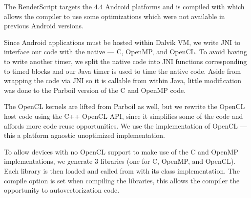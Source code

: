 The RenderScript targets the $4.4$ Android platforms and 
	is compiled with  which
	allows the compiler to use some optimizations which were not available in
	previous Android versions.

Since Android applications must be hosted within Dalvik VM, we write JNI to 
	interface our code with the native 
	--- C, OpenMP, and OpenCL. To avoid having to write another timer, 
	we split the native code into JNI functions corresponding to timed blocks and our
	Java timer is used to time the native code.
	Aside from
wrapping the code via JNI so it is callable from within Java, little
modification was done to the Parboil version of the C and OpenMP code.


The OpenCL kernels are lifted from Parboil as well, but we rewrite the 
	OpenCL host code using the C++ OpenCL API, since it simplifies some of the
	code and affords more code reuse opportunities.
We use the  implementation of OpenCL --- this a
platform agnostic unoptimized implementation.

To allow devices with no OpenCL support to make use of the C and OpenMP
implementations, we generate 3 libraries (one for C, OpenMP, and OpenCL).  Each
library is then loaded and called from with its class implementation.
The 
 compile option  is set when compiling the libraries, this allows the compiler the opportunity to autovectorization code.
